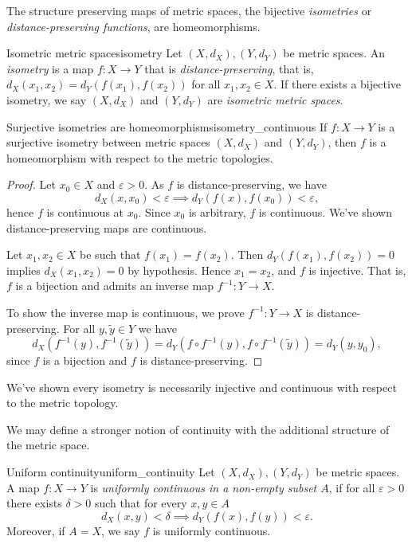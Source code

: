 The structure preserving maps of metric spaces, the bijective \emph{isometries} or \emph{distance-preserving functions}, are homeomorphisms.
\begin{definition}{Isometric metric spaces}{isometry}
    Let \((X, d_X), (Y, d_Y)\) be metric spaces. An \emph{isometry} is a map \(f : X \to Y\) that is \emph{distance-preserving}, that is, \(d_X(x_1, x_2) = d_Y(f(x_1), f(x_2))\) for all \(x_1,x_2 \in X\). If there exists a bijective isometry, we say \((X, d_X)\) and \((Y, d_Y)\) are \emph{isometric metric spaces}.
\end{definition}
\begin{proposition}{Surjective isometries are homeomorphisms}{isometry_continuous}
    If \(f: X \to Y\) is a surjective isometry between metric spaces \((X, d_X)\) and \((Y, d_Y)\), then \(f\) is a homeomorphism with respect to the metric topologies.
\end{proposition}
\begin{proof}
    Let \(x_0 \in X\) and \(\varepsilon > 0\). As \(f\) is distance-preserving, we have
    \begin{equation*}
        d_X(x, x_0) < \varepsilon \implies d_Y(f(x), f(x_0)) < \varepsilon,
    \end{equation*}
    hence \(f\) is continuous at \(x_0\). Since \(x_0\) is arbitrary, \(f\) is continuous. We've shown distance-preserving maps are continuous.

    Let \(x_1, x_2 \in X\) be such that \(f(x_1) = f(x_2)\). Then \(d_Y(f(x_1), f(x_2)) = 0\) implies \(d_X(x_1, x_2) = 0\) by hypothesis. Hence \(x_1 = x_2\), and \(f\) is injective. That is, \(f\) is a bijection and admits an inverse map \(f^{-1} : Y \to X\).

    To show the inverse map is continuous, we prove \(f^{-1} : Y \to X\) is distance-preserving. For all \(y, \tilde{y} \in Y\) we have
    \begin{equation*}
        d_X(f^{-1}(y), f^{-1}(\tilde{y})) = d_Y\left(f \circ f^{-1} (y), f \circ f^{-1} (\tilde{y})\right) = d_Y(y, y_0),
    \end{equation*}
    since \(f\) is a bijection and \(f\) is distance-preserving.
\end{proof}
\begin{remark}
    We've shown every isometry is necessarily injective and continuous with respect to the metric topology.
\end{remark}

We may define a stronger notion of continuity with the additional structure of the metric space.
\begin{definition}{Uniform continuity}{uniform_continuity}
    Let \((X, d_X), (Y, d_Y)\) be metric spaces. A map \(f : X \to Y\) is \emph{uniformly continuous in a non-empty subset \(A\)}, if for all \(\varepsilon > 0\) there exists \(\delta > 0\) such that for every \(x,y \in A\)
    \begin{equation*}
        d_X(x, y) < \delta \implies d_Y(f(x), f(y)) < \varepsilon.
    \end{equation*}
    Moreover, if \(A = X\), we say \(f\) is uniformly continuous.
\end{definition}

